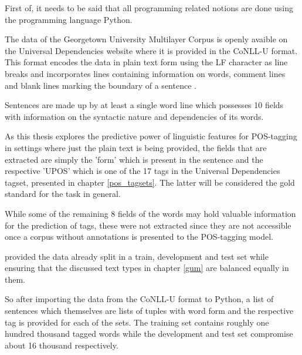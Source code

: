 First of, it needs to be said that all programming related notions are done using the programming language Python.

The data of the Georgetown University Multilayer Corpus is openly avaible on the Universal Dependencies website where it is provided in the CoNLL-U format. This format encodes the data in plain text form using the LF character as line breaks and incorporates lines containing information on words, comment lines and blank lines marking the boundary of a sentence \citep{ud2022opencom}.

Sentences are made up by at least a single word line which possesses 10 fields with information on the syntactic nature and dependencies of its words.

As this thesis explores the predictive power of linguistic features for POS-tagging in settings where just the plain text is being provided, the fields that are extracted are simply the 'form' which is present in the sentence and the respective 'UPOS' which is one of the 17 tags in the Universal Dependencies tagset, presented in chapter \ref{pos_tagsets}. The latter will be considered the gold standard for the task in general.

While some of the remaining 8 fields of the words may hold valuable information for the prediction of tags, these were not extracted since they are not accessible once a corpus without annotations is presented to the POS-tagging model.

\citet{Zeldes2017} provided the data already split in a train, development and test set while ensuring that the discussed text types in chapter \ref{gum} are balanced equally in them.

So after importing the data from the CoNLL-U format to Python, a list of sentences which themselves are lists of tuples with word form and the respective tag is provided for each of the sets. 
The training set contains roughly one hundred thousand tagged words while the development and test set compromise about 16 thousand respectively.